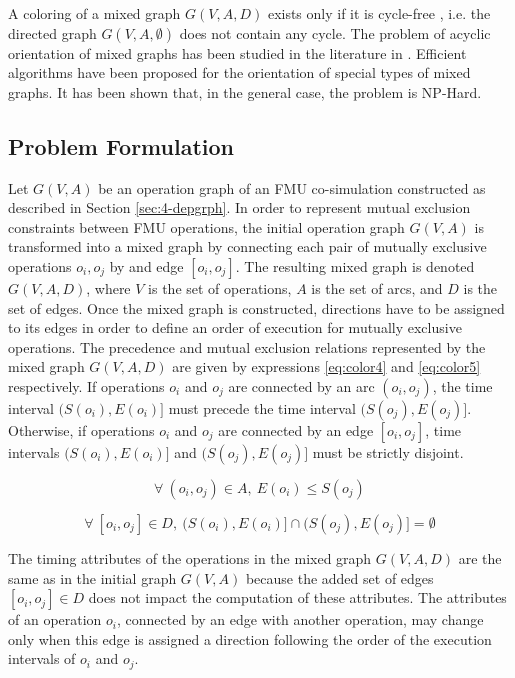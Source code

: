 A coloring of a mixed graph $G(V,A,D)$ exists only if it is cycle-free \cite{ries:2007}, i.e. the directed graph $G(V,A,\emptyset)$ does not contain any cycle. The problem of acyclic orientation of mixed graphs has been studied in the literature in \cite{andreev:2000,sotskov:2002,al-anzi:2006}. Efficient algorithms have been proposed for the orientation of special types of mixed graphs. It has been shown that, in the general case, the problem is NP-Hard.

\subsection{Problem Formulation}

Let $G(V,A)$ be an operation graph of an FMU co-simulation constructed as described in Section \ref{sec:4-depgrph}. In order to represent mutual exclusion constraints between FMU operations, the initial operation graph $G(V,A)$ is transformed into a mixed graph by connecting each pair of mutually exclusive operations $o_i, o_j$ by and edge $[o_i, o_j]$. The resulting mixed graph is denoted $G(V,A,D)$, where $V$ is the set of operations, $A$ is the set of arcs, and $D$ is the set of edges. Once the mixed graph is constructed, directions have to be assigned to its edges in order to define an order of execution for mutually exclusive operations. The precedence and mutual exclusion relations represented by the mixed graph $G(V,A,D)$ are given by expressions \ref{eq:color4} and \ref{eq:color5} respectively. If operations $o_i$ and $o_j$ are connected by an arc $(o_i,o_j)$, the time interval $(S(o_i), E(o_i)]$ must precede the time interval $(S(o_j), E(o_j)]$. Otherwise, if operations $o_i$ and $o_j$ are connected by an edge $[o_i,o_j]$, time intervals $(S(o_i), E(o_i)]$ and $(S(o_j), E(o_j)]$ must be strictly disjoint.

\begin{equation}
\forall\ (o_i,o_j) \in A,\ E(o_i) \leq S(o_j)
\label{eq:color4}
\end{equation}

\begin{equation}
\forall\ [o_i,o_j] \in D,\  (S(o_i), E(o_i)] \cap (S(o_j), E(o_j)] = \emptyset
\label{eq:color5}
\end{equation}

The timing attributes of the operations in the mixed graph $G(V,A,D)$ are the same as in the initial graph $G(V,A)$ because the added set of edges $[o_i, o_j] \in D$ does not impact the computation of these attributes. The attributes of an operation $o_i$, connected by an edge with another operation, may change only when this edge is assigned a direction following the order of the execution intervals of $o_i$ and $o_j$. 

